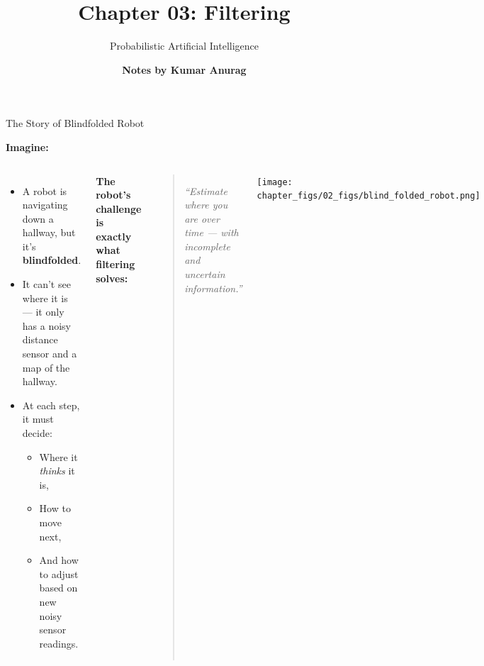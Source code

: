 \documentclass[handout,aspectratio=169]{beamer}
\title{
Chapter 03: Filtering
}
\author{\bf Notes by Kumar Anurag}
\date{}
\subtitle{
Probabilistic Artificial Intelligence
}
\begin{document}
{
	\begin{frame}
		\maketitle
	\end{frame}}



\begin{frame}{The Story of Blindfolded Robot}

\textbf{Imagine:}

\begin{columns}
\begin{itemize}
  \item A robot is navigating down a hallway, but it’s \textbf{blindfolded}.
  \item It can’t see where it is — it only has a noisy distance sensor and a map of the hallway.
  \item At each step, it must decide:
  \begin{itemize}
    \item Where it \textit{thinks} it is,
    \item How to move next,
    \item And how to adjust based on new noisy sensor readings.
  \end{itemize}
\end{itemize}

\vspace{1em}
\textbf{The robot’s challenge is exactly what filtering solves:}
\begin{quote}
  \centering
  \emph{“Estimate where you are over time — with incomplete and uncertain information.”}
\end{quote}

    \begin{center}
		\texttt{[image: chapter\_figs/02\_figs/blind\_folded\_robot.png]}
\end{center}
\end{columns}


\end{frame}
\end{document}

